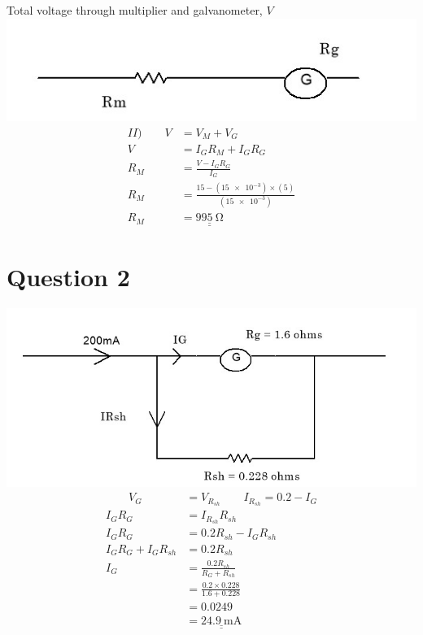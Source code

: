 \documentclass[12pt]{article}
\begin{document}
Total voltage through multiplier and galvanometer, $V$ \\
\includegraphics[width=\textwidth]{ques1ii}
\begin{align*}
	II) \qquad V &= V_{M} + V_{G} \\
	           V &= I_{G} R_{M} + I_{G} R_{G} \\
	       R_M &= \frac{V - I_G R_G}{I_G} \\
	      R_M &= \frac{15 -(\num{15e-3}) \times (\num{5}) }{(\num{15e-3})} \\
	      R_M &= \underline{\underline{\qty{995}{\ohm}}} 
\end{align*}

\vspace{1cm}
\section*{Question 2}
\includegraphics[width=\textwidth]{ques2}
\begin{align*}
\qquad	V_G &= V_{R_{sh}}  \qquad I_{R_{sh}} = 0.2 - I_{G} \\
		I_G R_G &= I_{R_{sh}} R_{sh}    \\
		I_G R_G &= 0.2 R_{sh} - I_G R_{sh} \\
	I_G R_G + I_G R_{sh} &= \num{0.2} R_{sh} \\
	I_G &= \frac{0.2R_{sh}}{R_G + R_{sh}} \\
	   &= \frac{\num{0.2} \times \num{0.228}}{\num{1.6} + \num{0.228}} \\
	   &= 0.0249 \\
	   &= \underline{\underline{\qty{24.9}{\milli\ampere}}}
\end{align*}
\end{document}
